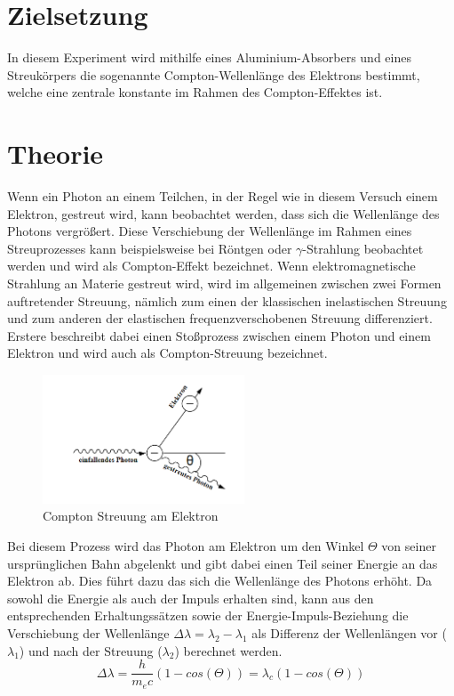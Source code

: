 \section{Zielsetzung}
In diesem Experiment wird mithilfe eines Aluminium-Absorbers und eines Streukörpers die sogenannte Compton-Wellenlänge des Elektrons bestimmt, welche eine zentrale konstante im Rahmen des Compton-Effektes ist.
\section{Theorie}
Wenn ein Photon an einem Teilchen, in der Regel wie in diesem Versuch einem Elektron, gestreut wird, kann beobachtet werden, dass sich die Wellenlänge des Photons vergrößert. Diese Verschiebung der Wellenlänge im Rahmen eines Streuprozesses kann beispielsweise bei Röntgen oder $\gamma$-Strahlung beobachtet werden und wird als Compton-Effekt bezeichnet.
Wenn elektromagnetische Strahlung an Materie gestreut wird, wird im allgemeinen zwischen zwei Formen auftretender Streuung, nämlich zum einen der klassischen inelastischen Streuung und zum anderen der elastischen frequenzverschobenen Streuung differenziert. Erstere beschreibt dabei einen Stoßprozess zwischen einem Photon und einem Elektron und wird auch als Compton-Streuung bezeichnet.
\begin{figure} [h]
    \centering
    \includegraphics[width=6cm, keepaspectratio]{Compton Effekt}
    \caption{Compton Streuung am Elektron}
    \label{fig:Compton}
 \end{figure}
Bei diesem Prozess wird das Photon am Elektron um den Winkel $\Theta$ von seiner ursprünglichen Bahn abgelenkt und gibt dabei einen Teil seiner Energie an das Elektron ab. Dies führt dazu das sich die Wellenlänge des Photons erhöht. Da sowohl die Energie als auch der Impuls erhalten sind, kann aus den entsprechenden Erhaltungssätzen sowie der Energie-Impuls-Beziehung die Verschiebung der Wellenlänge $\Delta \lambda=\lambda_2-\lambda _1$ als Differenz der Wellenlängen vor ($\lambda_1$) und nach der Streuung ($\lambda_2$) berechnet werden.
\begin{equation}
\Delta \lambda=\frac{h}{m_ec}(1-cos(\Theta))=\lambda_c(1-cos(\Theta))
\end{equation}
